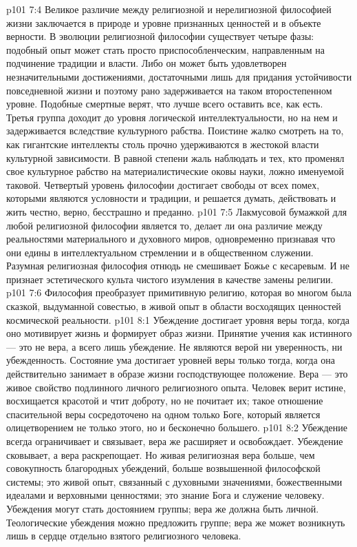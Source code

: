 \vs p101 7:4 \pc Великое различие между религиозной и нерелигиозной философией жизни заключается в природе и уровне признанных ценностей и в объекте верности. В эволюции религиозной философии существует четыре фазы: подобный опыт может стать просто приспособленческим, направленным на подчинение традиции и власти. Либо он может быть удовлетворен незначительными достижениями, достаточными лишь для придания устойчивости повседневной жизни и поэтому рано задерживается на таком второстепенном уровне. Подобные смертные верят, что лучше всего оставить все, как есть. Третья группа доходит до уровня логической интеллектуальности, но на нем и задерживается вследствие культурного рабства. Поистине жалко смотреть на то, как гигантские интеллекты столь прочно удерживаются в жестокой власти культурной зависимости. В равной степени жаль наблюдать и тех, кто променял свое культурное рабство на материалистические оковы науки, ложно именуемой таковой. Четвертый уровень философии достигает свободы от всех помех, которыми являются условности и традиции, и решается думать, действовать и жить честно, верно, бесстрашно и преданно.
\vs p101 7:5 Лакмусовой бумажкой для любой религиозной философии является то, делает ли она различие между реальностями материального и духовного миров, одновременно признавая что они едины в интеллектуальном стремлении и в общественном служении. Разумная религиозная философия отнюдь не смешивает Божье с кесаревым. И не признает эстетического культа чистого изумления в качестве замены религии.
\vs p101 7:6 Философия преобразует примитивную религию, которая во многом была сказкой, выдуманной совестью, в живой опыт в области восходящих ценностей космической реальности.
\vs p101 8:1 Убеждение достигает уровня веры тогда, когда оно мотивирует жизнь и формирует образ жизни. Принятие учения как истинного --- это не вера, а всего лишь убеждение. Не являются верой ни уверенность, ни убежденность. Состояние ума достигает уровней веры только тогда, когда она действительно занимает в образе жизни господствующее положение. Вера --- это живое свойство подлинного личного религиозного опыта. Человек верит истине, восхищается красотой и чтит доброту, но не почитает их; такое отношение спасительной веры сосредоточено на одном только Боге, который является олицетворением не только этого, но и бесконечно большего.
\vs p101 8:2 Убеждение всегда ограничивает и связывает, вера же расширяет и освобождает. Убеждение сковывает, а вера раскрепощает. Но живая религиозная вера больше, чем совокупность благородных убеждений, больше возвышенной философской системы; это живой опыт, связанный с духовными значениями, божественными идеалами и верховными ценностями; это знание Бога и служение человеку. Убеждения могут стать достоянием группы; вера же должна быть личной. Теологические убеждения можно предложить группе; вера же может возникнуть лишь в сердце отдельно взятого религиозного человека.
